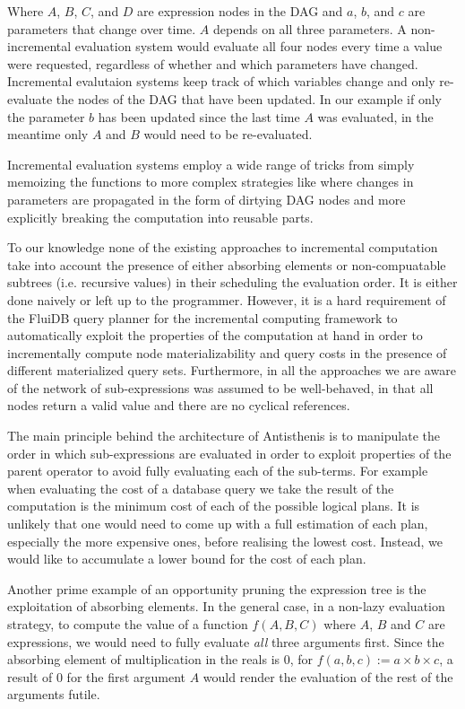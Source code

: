 Where \(A\), \(B\), \(C\), and \(D\) are expression nodes in the DAG
and \(a\), \(b\), and \(c\) are parameters that change over
time. \(A\) depends on all three parameters. A non-incremental
evaluation system would evaluate all four nodes every time a value
were requested, regardless of whether and which parameters have
changed. Incremental evalutaion systems keep track of which variables
change and only re-evaluate the nodes of the DAG that have been
updated. In our example if only the parameter \(b\) has been updated
since the last time \(A\) was evaluated, in the meantime only \(A\)
and \(B\) would need to be re-evaluated.

Incremental evaluation systems employ a wide range of tricks from
simply memoizing the functions
\cite{pughIncrementalComputationFunction1989} to more complex
strategies like \cite{hammerAdaptonComposableDemanddriven2014a} where
changes in parameters are propagated in the form of dirtying DAG nodes
and more explicitly breaking the computation into reusable parts.

To our knowledge none of the existing approaches to incremental
computation take into account the presence of either absorbing
elements or non-compuatable subtrees (i.e. recursive values) in their
scheduling the evaluation order. It is either done naively or left up
to the programmer. However, it is a hard requirement of the FluiDB
query planner for the incremental computing framework to automatically
exploit the properties of the computation at hand in order to
incrementally compute node materializability and query costs in the
presence of different materialized query sets. Furthermore, in all the
approaches we are aware of the network of sub-expressions was assumed
to be well-behaved, in that all nodes return a valid value and there
are no cyclical references.

The main principle behind the architecture of Antisthenis is to
manipulate the order in which sub-expressions are evaluated in order
to exploit properties of the parent operator to avoid fully evaluating
each of the sub-terms. For example when evaluating the cost of a
database query we take the result of the computation is the minimum
cost of each of the possible logical plans. It is unlikely that one
would need to come up with a full estimation of each plan, especially
the more expensive ones, before realising the lowest cost. Instead, we
would like to accumulate a lower bound for the cost of each plan.

Another prime example of an opportunity pruning the expression tree is
the exploitation of absorbing elements. In the general case, in a
non-lazy evaluation strategy, to compute the value of a function
\(f(A,B,C)\) where \(A\), \(B\) and \(C\) are expressions, we would
need to fully evaluate \emph{all} three arguments first. Since the
absorbing element of multiplication in the reals is 0, for
\(f(a,b,c) := a \times b \times c\), a result of 0 for the first
argument \(A\) would render the evaluation of the rest of the
arguments futile.

